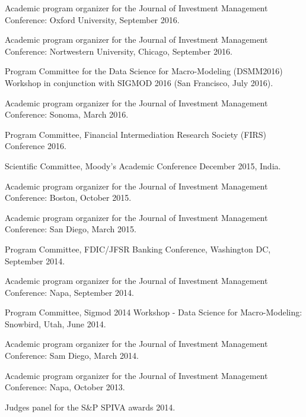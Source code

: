 \documentclass{article}
\begin{document}
\begin{description}
\begin{etaremune}
\item Academic program organizer for the Journal of Investment Management
Conference: Oxford University, September 2016. 

\item Academic program organizer for the Journal of Investment Management
Conference: Nortwestern University, Chicago, September 2016. 

\item Program Committee for the Data Science for Macro-Modeling (DSMM2016) Workshop in conjunction with SIGMOD 2016 (San Francisco, July 2016).


\item Academic program organizer for the Journal of Investment Management
Conference: Sonoma, March 2016. 

\item Program Committee, Financial Intermediation Research Society (FIRS) Conference 2016. 

\item Scientific Committee, Moody's Academic Conference December 2015, India. 

\item Academic program organizer for the Journal of Investment Management
Conference: Boston, October 2015. 

\item Academic program organizer for the Journal of Investment Management
Conference: San Diego, March 2015. 

\item Program Committee, FDIC/JFSR Banking Conference, Washington DC, September 2014. 

\item Academic program organizer for the Journal of Investment Management
Conference: Napa, September 2014. 

\item Program Committee, Sigmod 2014 Workshop - Data Science for Macro-Modeling: Snowbird, Utah, June 2014.  

\item Academic program organizer for the Journal of Investment Management
Conference: Sam Diego, March 2014. 

\item Academic program organizer for the Journal of Investment Management
Conference: Napa, October 2013. 

\item Judges panel for the S\&P SPIVA awards 2014. 


\end{etaremune}
\end{description}
\end{document}

